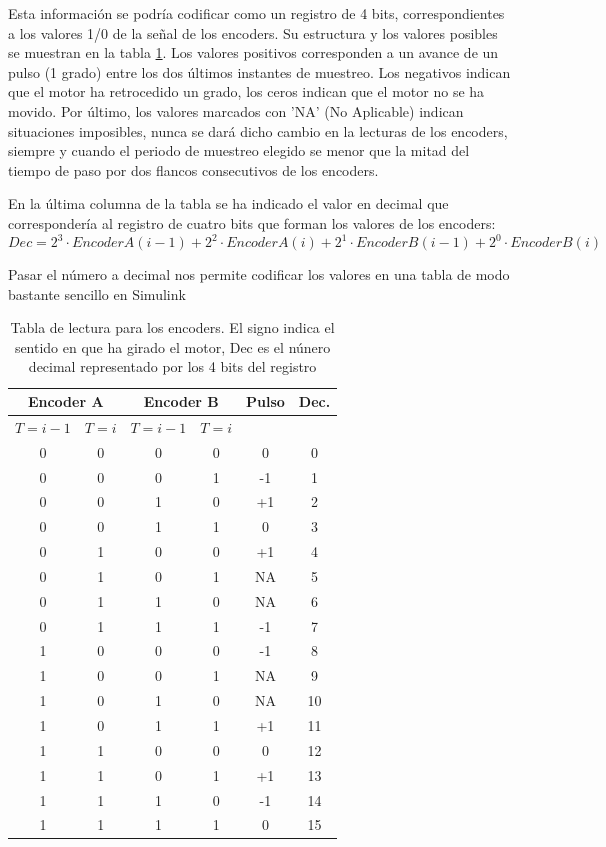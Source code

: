 \documentclass[10pt,a4paper]{report}
\begin{document}
Esta información se podría codificar como un registro de 4 bits, correspondientes a los valores 1/0 de la señal de los encoders. Su estructura y los valores posibles se muestran en la tabla \ref{t3}. Los valores positivos corresponden a un avance de un pulso (1 grado) entre los dos últimos instantes de muestreo. Los negativos indican que el motor ha retrocedido un grado, los ceros indican  que el motor no se ha movido. Por último, los valores marcados con 'NA' (No Aplicable) indican situaciones imposibles, nunca se dará dicho cambio en la lecturas de los encoders, siempre y cuando el periodo de muestreo elegido se menor que la mitad del tiempo de paso por dos flancos consecutivos de los encoders.

En la última columna de la tabla se ha indicado el valor en decimal que correspondería al registro de cuatro bits que forman los valores de los encoders:
\begin{equation}\label{eq1}
Dec = 2^3\cdot EncoderA(i-1)+2^2\cdot EncoderA(i)+2^1\cdot EncoderB(i-1)+2^0\cdot EncoderB(i)
\end{equation}

Pasar el número a decimal nos permite codificar los valores en una tabla de modo bastante sencillo en Simulink
\begin{table}
\centering
\begin{tabular}{c c c c c c}
\multicolumn{2}{c}{\textbf{Encoder A}}&\multicolumn{2}{c}{\textbf{Encoder B}}&Pulso&Dec.\\
\hline
$T = i-1$&$T =i$&$T = i-1$&$T =i$& &\\
0&0&0&0&0&0\\
0&0&0&1&-1&1\\
0&0&1&0&+1&2\\
0&0&1&1&0&3\\
0&1&0&0&+1&4\\
0&1&0&1&NA&5\\
0&1&1&0&NA&6\\
0&1&1&1&-1&7\\
1&0&0&0&-1&8\\
1&0&0&1&NA&9\\
1&0&1&0&NA&10\\
1&0&1&1&+1&11\\
1&1&0&0&0&12\\
1&1&0&1&+1&13\\
1&1&1&0&-1&14\\
1&1&1&1&0&15\\
\hline
\end{tabular}
\caption{Tabla de lectura para los encoders. El signo indica el sentido en que ha girado el motor, Dec es el núnero decimal representado por los 4 bits del registro}\label{t3}
\end{table}
\end{document}
